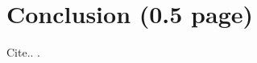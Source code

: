 \documentclass[11pt,letterpaper]{article}
\begin{document}
\section{Conclusion (0.5 page)}



   Cite.. \cite{Katz:1987}.




\end{document}
